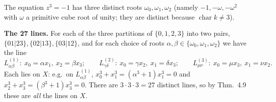 \documentclass[11pt]{article}
\begin{document}
The equation $z^3=-1$ has three distinct roots $\omega_0,\omega_1,\omega_2$ (namely $-1,-\omega,-\omega^2$ with $\omega$ a primitive cube root of unity; they are distinct because $\operatorname{char}k\ne3$).

\textbf{The 27 lines.} For each of the three partitions of $\{0,1,2,3\}$ into two pairs, $\{01|23\},\{02|13\},\{03|12\}$, and for each choice of roots $\alpha,\beta\in\{\omega_0,\omega_1,\omega_2\}$ we have the line
\[
L^{(1)}_{\alpha\beta}:\ x_0=\alpha x_1,\ x_2=\beta x_3;\qquad L^{(2)}_{\gamma\delta}:\ x_0=\gamma x_2,\ x_1=\delta x_3;\qquad L^{(3)}_{\mu\nu}:\ x_0=\mu x_3,\ x_1=\nu x_2 .
\]
Each lies on $X$: e.g.\ on $L^{(1)}_{\alpha\beta}$, $x_0^3+x_1^3=(\alpha^3+1)x_1^3=0$ and $x_2^3+x_3^3=(\beta^3+1)x_3^3=0$. There are $3\cdot3\cdot3=27$ distinct lines, so by Thm.~4.9 these are \emph{all} the lines on $X$.
\end{document}

